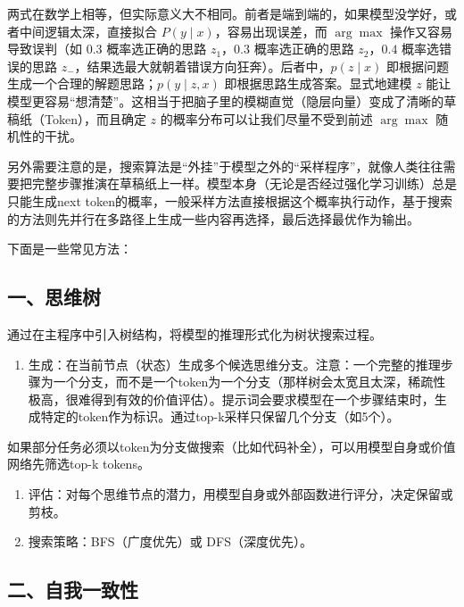 两式在数学上相等，但实际意义大不相同。前者是端到端的，如果模型没学好，或者中间逻辑太深，直接拟合 \(P(y\mid x)\)，容易出现误差，而 \(\arg\max\) 操作又容易导致误判（如 \(0.3\) 概率选正确的思路 \(z_1\)，\(0.3\) 概率选正确的思路 \(z_2\)，\(0.4\) 概率选错误的思路 \(z_-\)，结果选最大就朝着错误方向狂奔）。后者中，\(p(z\mid x)\) 即根据问题生成一个合理的解题思路；\(p(y\mid z,x)\) 即根据思路生成答案。显式地建模 \(z\) 能让模型更容易``想清楚''。这相当于把脑子里的模糊直觉（隐层向量）变成了清晰的草稿纸（Token），而且确定 \(z\) 的概率分布可以让我们尽量不受到前述 \(\arg\max\) 随机性的干扰。

另外需要注意的是，搜索算法是``外挂''于模型之外的``采样程序''，就像人类往往需要把完整步骤推演在草稿纸上一样。模型本身（无论是否经过强化学习训练）总是只能生成next token的概率，一般采样方法直接根据这个概率执行动作，基于搜索的方法则先并行在多路径上生成一些内容再选择，最后选择最优作为输出。

下面是一些常见方法：

\hypertarget{ux4e00ux601dux7ef4ux6811}{%
\subsection{一、思维树}\label{ux4e00ux601dux7ef4ux6811}}

通过在主程序中引入树结构，将模型的推理形式化为树状搜索过程。

\begin{enumerate}
\def\labelenumi{\arabic{enumi}.}
\tightlist
\item
  生成：在当前节点（状态）生成多个候选思维分支。注意：一个完整的推理步骤为一个分支，而不是一个token为一个分支（那样树会太宽且太深，稀疏性极高，很难得到有效的价值评估）。提示词会要求模型在一个步骤结束时，生成特定的token作为标识。通过top-k采样只保留几个分支（如5个）。
\end{enumerate}

如果部分任务必须以token为分支做搜索（比如代码补全），可以用模型自身或价值网络先筛选top-k tokens。

\begin{enumerate}
\def\labelenumi{\arabic{enumi}.}
\setcounter{enumi}{1}
\item
  评估：对每个思维节点的潜力，用模型自身或外部函数进行评分，决定保留或剪枝。
\item
  搜索策略：BFS（广度优先）或 DFS（深度优先）。
\end{enumerate}

\hypertarget{ux4e8cux81eaux6211ux4e00ux81f4ux6027}{%
\subsection{二、自我一致性}\label{ux4e8cux81eaux6211ux4e00ux81f4ux6027}}

